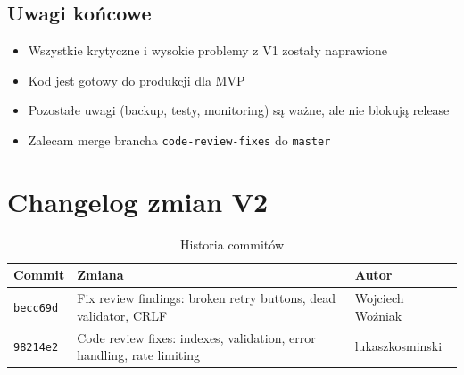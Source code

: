 \documentclass[a4paper,12pt]{article}
\begin{document}
\subsection*{Uwagi końcowe}

\begin{itemize}
    \item Wszystkie krytyczne i wysokie problemy z V1 zostały naprawione
    \item Kod jest gotowy do produkcji dla MVP
    \item Pozostałe uwagi (backup, testy, monitoring) są ważne, ale nie blokują release
    \item Zalecam merge brancha \texttt{code-review-fixes} do \texttt{master}
\end{itemize}

\section*{Changelog zmian V2}

\begin{table}[h!]
\centering
\caption{Historia commitów}
\label{tab:changelog}
\begin{tabular}{lll}
\toprule
\textbf{Commit} & \textbf{Zmiana} & \textbf{Autor} \\
\midrule
\texttt{becc69d} & Fix review findings: broken retry buttons, dead validator, CRLF & Wojciech Woźniak \\
\texttt{98214e2} & Code review fixes: indexes, validation, error handling, rate limiting & lukaszkosminski \\
\bottomrule
\end{tabular}
\end{table}
\end{document}
